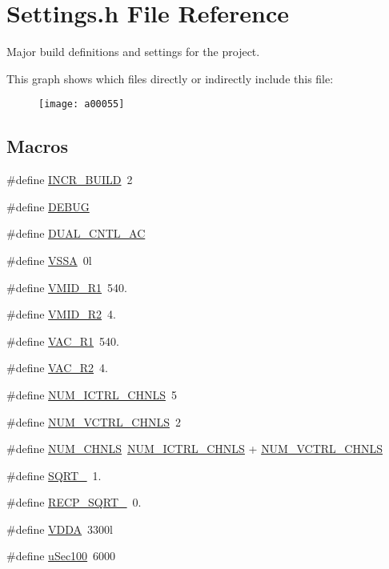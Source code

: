 \hypertarget{a00031}{\section{Settings.\-h File Reference}
\label{a00031}
}


Major build definitions and settings for the project.  


This graph shows which files directly or indirectly include this file\-:\nopagebreak
\begin{figure}[H]
\begin{center}
\leavevmode
\texttt{[image: a00055]}
\end{center}
\end{figure}
\subsection*{Macros}
\begin{DoxyCompactItemize}
\item 
\#define \hyperlink{a00031_abf493281a7e64fe88660c38753e18d56}{I\-N\-C\-R\-\_\-\-B\-U\-I\-L\-D}~2
\item 
\#define \hyperlink{a00031_ad72dbcf6d0153db1b8d8a58001feed83}{D\-E\-B\-U\-G}
\item 
\#define \hyperlink{a00031_a600b96e7a1d3cd28e228833bb61f8074}{D\-U\-A\-L\-\_\-\-C\-N\-T\-L\-\_\-\-A\-C}
\item 
\#define \hyperlink{a00031_a3c2e957a61cfa19e31e8477fe3aacab8}{V\-S\-S\-A}~0l
\item 
\#define \hyperlink{a00031_a511faa1530ba984d340a884a97e6a80a}{V\-M\-I\-D\-\_\-\-R1}~540.
\item 
\#define \hyperlink{a00031_a86d7f47e3c125143c21e1ca2836eb4ab}{V\-M\-I\-D\-\_\-\-R2}~4.
\item 
\#define \hyperlink{a00031_a67fad1f78c49251e39fa6f1d5ff43e9e}{V\-A\-C\-\_\-\-R1}~540.
\item 
\#define \hyperlink{a00031_a087778c4195e73f588e5c3cf7d9e9206}{V\-A\-C\-\_\-\-R2}~4.
\item 
\#define \hyperlink{a00031_a69b2e41c3deaae85991311202c4a1a14}{N\-U\-M\-\_\-\-I\-C\-T\-R\-L\-\_\-\-C\-H\-N\-L\-S}~5
\item 
\#define \hyperlink{a00031_a42a316162edffd07a32e68a889760c06}{N\-U\-M\-\_\-\-V\-C\-T\-R\-L\-\_\-\-C\-H\-N\-L\-S}~2
\item 
\#define \hyperlink{a00031_afe433b138bb71d8d26b6e0907e656d1b}{N\-U\-M\-\_\-\-C\-H\-N\-L\-S}~\hyperlink{a00031_a69b2e41c3deaae85991311202c4a1a14}{N\-U\-M\-\_\-\-I\-C\-T\-R\-L\-\_\-\-C\-H\-N\-L\-S} + \hyperlink{a00031_a42a316162edffd07a32e68a889760c06}{N\-U\-M\-\_\-\-V\-C\-T\-R\-L\-\_\-\-C\-H\-N\-L\-S}
\item 
\#define \hyperlink{a00031_abc63ab2a8e7782de38a5dbdfc33da717}{S\-Q\-R\-T\-\_}~1.
\item 
\#define \hyperlink{a00031_ae468f418f2e6410dfcfeb58bcbbde516}{R\-E\-C\-P\-\_\-\-S\-Q\-R\-T\-\_}~0.
\item 
\#define \hyperlink{a00031_a2d52976aedaedf74a90019a689170620}{V\-D\-D\-A}~3300l
\item 
\#define \hyperlink{a00031_aa010c11f88da0f9a48a7dfd810412d5d}{u\-Sec100}~6000
\end{DoxyCompactItemize}
